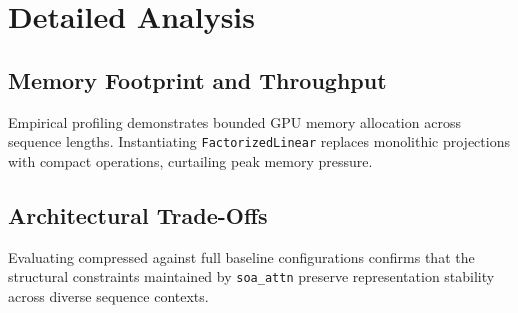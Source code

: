 \section{Detailed Analysis}

\subsection{Memory Footprint and Throughput}
Empirical profiling demonstrates bounded GPU memory allocation across sequence lengths. Instantiating \texttt{FactorizedLinear} replaces monolithic projections with compact operations, curtailing peak memory pressure.

\subsection{Architectural Trade-Offs}
Evaluating compressed against full baseline configurations confirms that the structural constraints maintained by \texttt{soa_attn} preserve representation stability across diverse sequence contexts.
